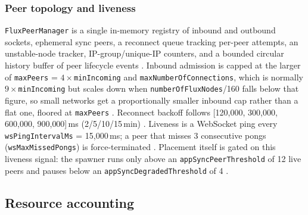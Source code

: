 \subsubsection{Peer topology and liveness}
\texttt{Flux\allowbreak{}Peer\allowbreak{}Manager} is a single in-memory registry of inbound and outbound sockets, ephemeral
sync peers, a reconnect queue tracking per-peer attempts, an unstable-node tracker, IP-group/unique-IP
counters, and a bounded circular history buffer of peer lifecycle events
. Inbound admission is capped at
the larger of \texttt{maxPeers} = $4\times$\texttt{minIncoming} and \texttt{max\allowbreak{}Number\allowbreak{}Of\allowbreak{}Connections}, which is normally
$9\times$\texttt{minIncoming} but scales down when \texttt{number\allowbreak{}Of\allowbreak{}Flux\allowbreak{}Nodes}/160 falls below that
figure, so small networks get a proportionally smaller inbound cap rather than a flat one, floored at \texttt{maxPeers}
. Reconnect backoff follows
[120{,}000, 300{,}000, 600{,}000, 900{,}000]\,ms (2/5/10/15\,min)
. Liveness is a WebSocket ping
every \texttt{ws\allowbreak{}Ping\allowbreak{}Interval\allowbreak{}Ms} = 15{,}000\,ms; a peer that misses 3 consecutive pongs
(\texttt{ws\allowbreak{}Max\allowbreak{}Missed\allowbreak{}Pongs}) is force-terminated
. Placement itself
is gated on this liveness signal: the spawner runs only above an \texttt{app\allowbreak{}Sync\allowbreak{}Peer\allowbreak{}Threshold} of
12 live peers and pauses below an \texttt{app\allowbreak{}Sync\allowbreak{}Degraded\allowbreak{}Threshold} of 4
.

\subsection{Resource accounting}
\label{sec:fluxos-resources}

